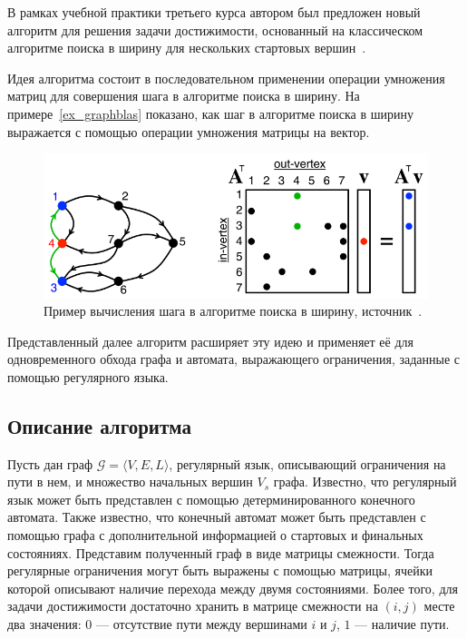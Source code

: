
В рамках учебной практики третьего курса автором был предложен новый алгоритм для решения задачи достижимости, основанный на классическом алгоритме поиска в ширину для нескольких стартовых вершин~\cite{method_msbfs}.

Идея алгоритма состоит в последовательном применении операции умножения матриц для совершения шага в алгоритме поиска в ширину. На примере~\ref{ex_graphblas} показано, как шаг в алгоритме поиска в ширину выражается с помощью операции умножения матрицы на вектор.

\begin{figure}[h!]
  \centering
  \includegraphics[width=0.7\linewidth]{pictures/AdjacencyMatrixGraphBLASBFS.png}
  \caption{Пример вычисления шага в алгоритме поиска в ширину, источник~\cite{method_gb_wiki}.}
\end{figure}\label{ex_graphblas}

Представленный далее алгоритм расширяет эту идею и применяет её для одновременного обхода графа и автомата, выражающего ограничения, заданные с помощью регулярного языка.

\subsection{Описание алгоритма}

Пусть дан граф $\mathcal{G} = \langle V, E, L\rangle$, регулярный язык, описывающий ограничения на пути в нем, и множество начальных вершин $V_{s}$ графа.
Известно, что регулярный язык может быть представлен с помощью детерминированного конечного автомата. Также известно, что конечный автомат может быть представлен с помощью графа с дополнительной информацией о стартовых и финальных состояниях. Представим полученный граф в виде матрицы смежности. Тогда регулярные ограничения могут быть выражены с помощью матрицы, ячейки которой описывают наличие перехода между двумя состояниями.  Более того, для задачи достижимости достаточно хранить в матрице смежности на $(i, j)$ месте два значения: $0$ --- отсутствие пути между вершинами $i$ и $j$, $1$ --- наличие пути.

